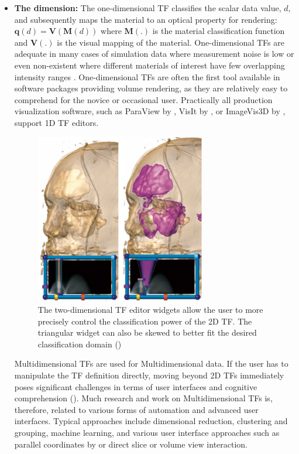 \begin{itemize}
\item \textbf{The dimension: } The one-dimensional TF classifies the scalar data value, $d$, and subsequently maps the material to an optical property for rendering: $ \textbf{q}(d)=\textbf{V}(\textbf{M}(d))$ where $\textbf{M}(.)$ is the material classification function and $\textbf{V}(.)$ is the
visual mapping of the material. One-dimensional TFs are adequate in many cases of simulation data where measurement noise is low or even non-existent where different materials of interest have few overlapping intensity
ranges \cite{4303986}. One-dimensional TFs are often the first tool available in software packages providing volume rendering, as they are relatively easy to comprehend for the novice or occasional user. Practically all production
visualization software, such as ParaView by \cite{paraview},
 VisIt by \cite{Childs:SciDAC2011}, 
or ImageVis3D by {\cite{Fogal2010Tuvok}}, support 1D TF editors.

\begin{figure}[th]
\centering
\includegraphics[width=0.7\textwidth]{Figures/2dtf}
\decoRule
\caption[2D transfer Function]{ The two-dimensional TF editor widgets allow the user
to more precisely control the classification power of the 2D TF.
The triangular widget can also be skewed to better fit the desired
classification domain (\cite{1021579}) }
\label{fig:tf2d}
\end{figure}

Multidimensional TFs are used for Multidimensional data. If the user has to manipulate the TF definition directly, moving beyond
2D TFs immediately poses significant challenges in terms of
user interfaces and cognitive comprehension (\cite{1021579}). Much research and
work on Multidimensional TFs is, therefore, related to various forms of automation
and advanced user interfaces. Typical approaches include dimensional reduction, clustering
and grouping, machine learning, and various user interface
approaches such as parallel coordinates by \cite{5742368} or direct slice or volume
view interaction. 


\end{itemize}
